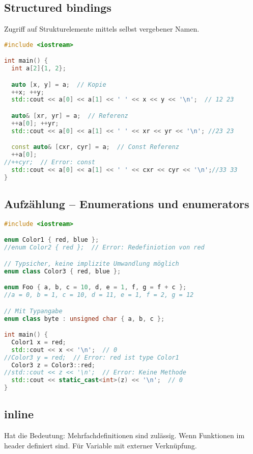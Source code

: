 \documentclass[10pt,twocolumn]{scrartcl}
\begin{document}
\subsection{Structured bindings}

Zugriff auf Strukturelemente mittels selbst vergebener Namen.

\begin{lstlisting}[language=C++]
#include <iostream>

int main() {
  int a[2]{1, 2};

  auto [x, y] = a;  // Kopie
  ++x; ++y;
  std::cout << a[0] << a[1] << ' ' << x << y << '\n';  // 12 23

  auto& [xr, yr] = a;  // Referenz
  ++a[0]; ++yr;
  std::cout << a[0] << a[1] << ' ' << xr << yr << '\n'; //23 23

  const auto& [cxr, cyr] = a;  // Const Referenz
  ++a[0];
//++cyr;  // Error: const
  std::cout << a[0] << a[1] << ' ' << cxr << cyr << '\n';//33 33
}
\end{lstlisting}

\subsection{Aufzählung -- Enumerations und enumerators}

\begin{lstlisting}[language=C++]
#include <iostream>

enum Color1 { red, blue };
//enum Color2 { red };  // Error: Redefiniotion von red

// Typsicher, keine implizite Umwandlung möglich
enum class Color3 { red, blue };

enum Foo { a, b, c = 10, d, e = 1, f, g = f + c };
//a = 0, b = 1, c = 10, d = 11, e = 1, f = 2, g = 12

// Mit Typangabe
enum class byte : unsigned char { a, b, c };

int main() {
  Color1 x = red;
  std::cout << x << '\n';  // 0
//Color3 y = red;  // Error: red ist type Color1
  Color3 z = Color3::red;
//std::cout << z << '\n';  // Error: Keine Methode
  std::cout << static_cast<int>(z) << '\n';  // 0
}
\end{lstlisting}

\subsection{inline}

Hat die Bedeutung: Mehrfachdefinitionen sind zulässig. Wenn Funktionen im header
definiert sind. Für Variable mit externer Verknüpfung.
\end{document}
